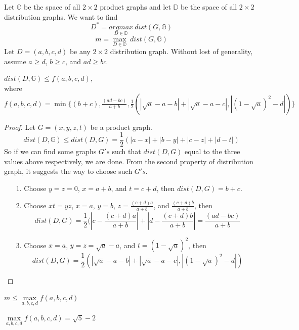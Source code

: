  
Let $\mathbb{G}$ be the space of all $2 \times 2$ product graphs and let $\mathbb{D}$ be the space of all $2 \times 2$ distribution graphs. We want to find 
$$ D^* = \underset{D \in \mathbb{D}} {argmax} \ dist(G, \mathbb{G})$$
$$m = \underset{D \in \mathbb{D}} {\max} \ dist(G, \mathbb{G})$$
Let $D = (a,b,c,d)$ be any $2 \times 2$ distribution graph. Without lost of generality, assume $a \geq d$,  $b \geq c$, and $ad \geq bc$ 

\begin{claim}
$dist(D, \mathbb{G}) \leq f(a,b,c,d)$, \\
where $f(a,b,c,d) = \min \{(b+c), \frac{(ad - bc)}{a+b},
\frac{1}{2}(| \sqrt{a} - a - b| + |\sqrt{a} - a - c|, |(1 - \sqrt{a})^2 -d|) \}$
\end{claim}

\begin{proof}
Let $G = (x,y,z,t)$ be a product graph.  
$$dist(D,\mathbb{G}) \leq dist(D,G) = \frac{1}{2} (|a-x| + |b-y| + |c-z| + |d-t|)$$
So if we can find some graphs $G's$ such that $dist(D,G)$ equal to the three values above respectively, we are done. From the second property of distribution graph, it suggests the way to choose such $G's$.
\begin{itemize}
\item [1.] Choose $y = z =0$, $x = a+b$, and $t = c+d$, then $dist(D,G) = b+c$.
\item [2.] Choose $xt = yz$, $x = a$, $y =b$, $z = \frac{(c+d)a}{a+b}$, and $\frac{(c+d)b}{a+b}$, then 
$$dist(D,G) = \frac{1}{2}(|c - \frac{(c+d)a}{a+b}| + |d - \frac{(c+d)b}{a+b}|
= \frac{(ad - bc)}{a+b} $$
\item [3.] Choose $x = a$, $y = z = \sqrt{a} - a$, and $t = (1 - \sqrt{a})^2$, then 
$$dist(D,G) = \frac{1}{2}(| \sqrt{a} - a - b| + |\sqrt{a} - a - c|, |(1 - \sqrt{a})^2 -d|) $$
\end{itemize}
\end{proof}

\begin{claim}
$m \leq \underset {a,b,c,d} {\max} f(a,b,c,d)$
\end{claim} 
\begin{claim} 
$\underset {a,b,c,d} {\max} f(a,b,c,d) = \sqrt{5} -2$
\end{claim}

